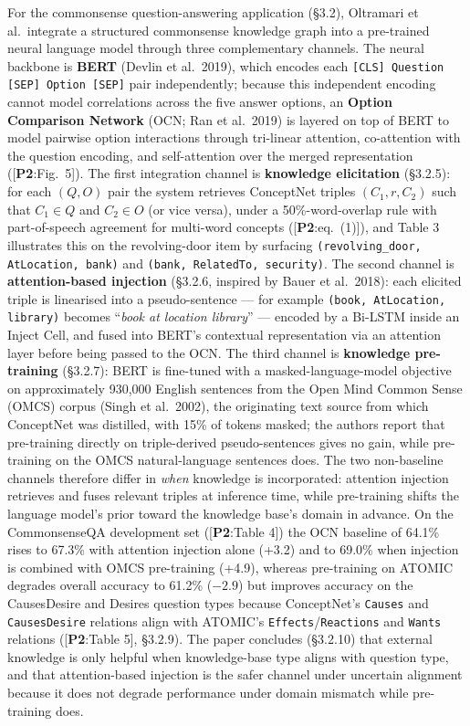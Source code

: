 \documentclass[11pt, a4paper]{article}
\newcommand{\paperref}[1]{\textcolor{srcBd}{\small[\textbf{P2}:#1]}}
\begin{document}
\begin{prosebox}
For the commonsense question-answering application (§3.2), Oltramari et al.\ integrate a structured commonsense knowledge graph into a pre-trained neural language model through three complementary channels. The neural backbone is \textbf{BERT} (Devlin et al.\ 2019), which encodes each \texttt{[CLS] Question [SEP] Option [SEP]} pair independently; because this independent encoding cannot model correlations across the five answer options, an \textbf{Option Comparison Network} (OCN; Ran et al.\ 2019) is layered on top of BERT to model pairwise option interactions through tri-linear attention, co-attention with the question encoding, and self-attention over the merged representation (\paperref{Fig.\ 5}). The first integration channel is \textbf{knowledge elicitation} (§3.2.5): for each \((Q, O)\) pair the system retrieves ConceptNet triples \((C_1, r, C_2)\) such that \(C_1 \in Q\) and \(C_2 \in O\) (or vice versa), under a 50\%-word-overlap rule with part-of-speech agreement for multi-word concepts (\paperref{eq.\ (1)}), and Table 3 illustrates this on the revolving-door item by surfacing \texttt{(revolving\_door, AtLocation, bank)} and \texttt{(bank, RelatedTo, security)}. The second channel is \textbf{attention-based injection} (§3.2.6, inspired by Bauer et al.\ 2018): each elicited triple is linearised into a pseudo-sentence — for example \texttt{(book, AtLocation, library)} becomes ``\emph{book at location library}'' — encoded by a Bi-LSTM inside an Inject Cell, and fused into BERT's contextual representation via an attention layer before being passed to the OCN. The third channel is \textbf{knowledge pre-training} (§3.2.7): BERT is fine-tuned with a masked-language-model objective on approximately 930{,}000 English sentences from the Open Mind Common Sense (OMCS) corpus (Singh et al.\ 2002), the originating text source from which ConceptNet was distilled, with 15\% of tokens masked; the authors report that pre-training directly on triple-derived pseudo-sentences gives no gain, while pre-training on the OMCS natural-language sentences does. The two non-baseline channels therefore differ in \emph{when} knowledge is incorporated: attention injection retrieves and fuses relevant triples at inference time, while pre-training shifts the language model's prior toward the knowledge base's domain in advance. On the CommonsenseQA development set (\paperref{Table 4}) the OCN baseline of 64.1\% rises to 67.3\% with attention injection alone (+3.2) and to 69.0\% when injection is combined with OMCS pre-training (+4.9), whereas pre-training on ATOMIC degrades overall accuracy to 61.2\% ($-2.9$) but improves accuracy on the CausesDesire and Desires question types because ConceptNet's \texttt{Causes} and \texttt{CausesDesire} relations align with ATOMIC's \texttt{Effects}/\texttt{Reactions} and \texttt{Wants} relations (\paperref{Table 5}, §3.2.9). The paper concludes (§3.2.10) that external knowledge is only helpful when knowledge-base type aligns with question type, and that attention-based injection is the safer channel under uncertain alignment because it does not degrade performance under domain mismatch while pre-training does.
\end{prosebox}
\end{document}
